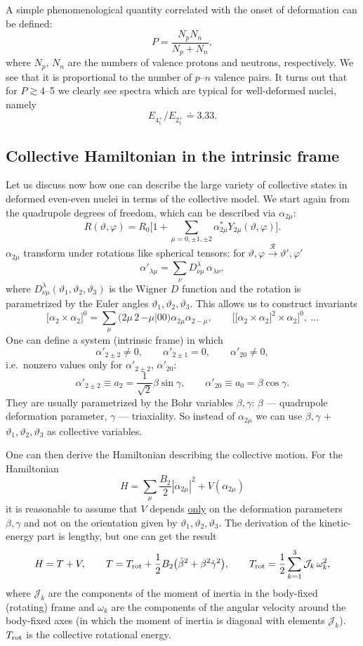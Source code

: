\documentclass[11pt,a4paper]{article}
\begin{document}
A simple phenomenological quantity correlated with the onset of deformation can be defined:
\[
P=\frac{N_pN_n}{N_p+N_n},
\]
where $N_p$, $N_n$ are the numbers of valence protons and neutrons, respectively. We see that it is proportional to the number of $p$--$n$ valence pairs. It turns out that for $P\gtrsim4$--5 we clearly see spectra which are typical for well-deformed nuclei, namely
\[
E_{4^+_1}/E_{2^+_1}\doteq3.33 .
\]

\subsection{Collective Hamiltonian in the intrinsic frame}
Let us discuss now how one can describe the large variety of collective states in deformed even-even nuclei in terms of the collective model. We start again from the quadrupole degrees of freedom, which can be described via $\alpha_{2\mu}$:
\[
R(\vartheta,\varphi)=R_0\Big[1+\sum_{\mu=0,\pm1,\pm2}\alpha^*_{2\mu}Y_{2\mu}(\vartheta,\varphi)\Big].
\]
$\alpha_{2\mu}$ transform under rotations like spherical tensors: for $\vartheta,\varphi\xrightarrow{\ \mathcal R\ }\vartheta',\varphi'$
\[
\alpha'_{\lambda\mu}=\sum_\nu D^\lambda_{\nu\mu}\,\alpha_{\lambda\nu},
\]
where $D^\lambda_{\nu\mu}(\vartheta_1,\vartheta_2,\vartheta_3)$ is the Wigner $D$ function and the rotation is parametrized by the Euler angles $\vartheta_1,\vartheta_2,\vartheta_3$. This allows us to construct invariants
\[
\big[\alpha_2\times\alpha_2\big]^0=\sum_\mu\big(2\mu\,2\,{-\mu}\big|00\big)\alpha_{2\mu}\alpha_{2-\mu},\qquad
\Big[\big[\alpha_2\times\alpha_2\big]^2\times\alpha_2\Big]^0,\ \dots
\]
One can define a system (intrinsic frame) in which
\[
\alpha'_{2\pm2}\neq0,\qquad \alpha'_{2\pm1}=0,\qquad \alpha'_{20}\neq0,
\]
i.e.\ nonzero values only for $\alpha'_{2\pm2}$, $\alpha'_{20}$:
\[
\alpha'_{2\pm2}\equiv a_2=\frac{1}{\sqrt2}\beta\sin\gamma,\qquad \alpha'_{20}\equiv a_0=\beta\cos\gamma .
\]
They are usually parametrized by the Bohr variables $\beta,\gamma$: $\beta$ --- quadrupole deformation parameter, $\gamma$ --- triaxiality. So instead of $\alpha_{2\mu}$ we can use $\beta,\gamma$ $+$ $\vartheta_1,\vartheta_2,\vartheta_3$ as collective variables.

One can then derive the Hamiltonian describing the collective motion. For the Hamiltonian
\[
H=\sum_\mu\frac{B_2}{2}|\dot\alpha_{2\mu}|^2+V(\alpha_{2\mu})
\]
it is reasonable to assume that $V$ depends \underline{only} on the deformation parameters $\beta,\gamma$ and not on the orientation given by $\vartheta_1,\vartheta_2,\vartheta_3$. The derivation of the kinetic-energy part is lengthy, but one can get the result
\[
H=T+V,\qquad
T=T_{\rm rot}+\frac12B_2\big(\dot\beta^2+\beta^2\dot\gamma^2\big),\qquad
T_{\rm rot}=\frac12\sum_{k=1}^3\mathcal J_k\,\omega_k^2 ,
\]
where $\mathcal J_k$ are the components of the moment of inertia in the body-fixed (rotating) frame and $\omega_k$ are the components of the angular velocity around the body-fixed axes (in which the moment of inertia is diagonal with elements $\mathcal J_k$). $T_{\rm rot}$ is the collective rotational energy.
\end{document}

